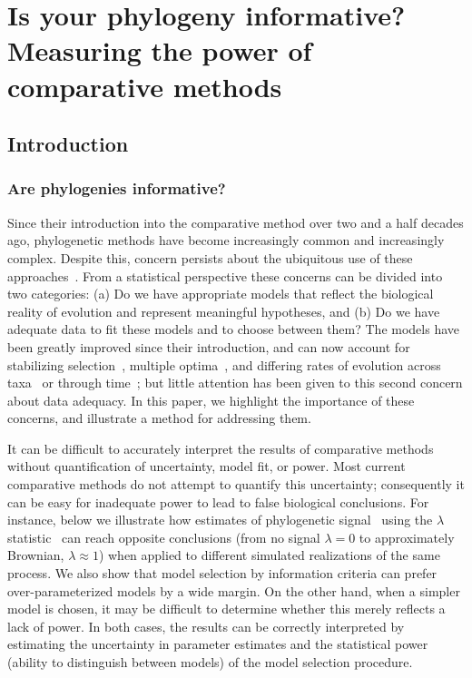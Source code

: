 

\chapter{Is your phylogeny informative? \\Measuring the power of comparative methods}

\section{Introduction}
\subsection{Are phylogenies informative?}
Since their introduction into the comparative method over two and a half decades ago,
phylogenetic methods have become increasingly common and increasingly complex.
Despite this, concern persists about the ubiquitous use of these approaches~\citep{Price1997,Losos2011c}.  
From a statistical perspective these concerns can be divided into two categories: 
(a) Do we have appropriate models that reflect the biological reality of evolution and represent meaningful hypotheses, and 
(b) Do we have adequate data to fit these models and to choose between them?
The models have been greatly improved since their introduction, 
and can now account for stabilizing selection~\citep{Hansen1996}, multiple optima~\citep{Butler2004}, 
and differing rates of evolution across taxa~\citep{O'Meara2006} 
or through time~\citep{Pagel1999, Blomberg2003};
but little attention has been given to this second concern about data adequacy.
In this paper, we highlight the importance of these concerns, and illustrate a method for addressing them.  



It can be difficult to accurately interpret the results of comparative methods
without quantification of uncertainty, model fit, or power. 
Most current comparative methods do not attempt to quantify this uncertainty;
consequently it can be easy for inadequate power to lead to false biological conclusions.
For instance, below 
we illustrate how estimates of phylogenetic signal~\citep{Gittleman1990} using the $\lambda$ statistic~\citep{Pagel1999, Revell2010} 
can reach opposite conclusions (from no signal $\lambda = 0$ to approximately Brownian, $\lambda \approx 1$) 
when applied to different simulated realizations of the same process.
We also show that model selection by information criteria can prefer over-parameterized models by a wide margin.  
On the other hand, when a simpler model is chosen,
it may be difficult to determine whether this merely reflects a lack of power.  
In both cases, the results can be correctly interpreted by estimating the uncertainty in parameter estimates
and the statistical power (ability to distinguish between models) of the model selection procedure.

